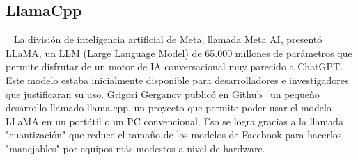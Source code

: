 \subsection{LlamaCpp}~\cite{metallamaLM}
La división de inteligencia artificial de Meta, llamada Meta AI, presentó LLaMA, un LLM (Large Language Model) de 
65.000 millones de parámetros que permite disfrutar de un motor de 
IA conversacional muy parecido a ChatGPT. 
Este modelo estaba inicialmente disponible para desarrolladores e investigadores 
que justificaran su uso.
Grigori Gerganov publicó en Github~\cite{gerganovllamaCpp} un pequeño desarrollo llamado llama.cpp,
un proyecto que permite poder usar el modelo LLaMA en un portátil 
o un PC convencional. Eso se logra gracias a la llamada "cuantización" 
que reduce el tamaño de los modelos de Facebook para hacerlos "manejables" 
por equipos más modestos a nivel de hardware.

